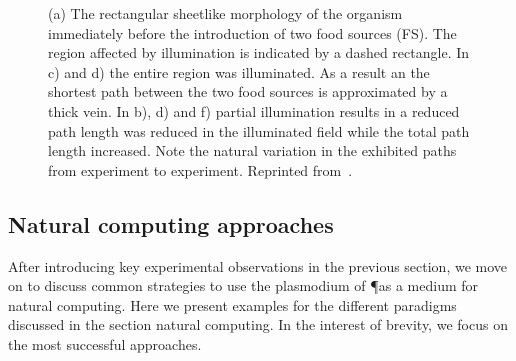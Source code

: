 			\begin{figure}[htop]
				\centering
				\newline
				\newline

				\caption[Classic maze experiment with \P]{(a)  The  rectangular  sheetlike  morphology  of  the organism  immediately  before  the  introduction  of  two  food sources (FS). The region affected by illumination is indicated by a dashed rectangle. In c) and d) the entire region was illuminated. As a result an the shortest path between the two food sources is approximated by a thick vein. In b), d) and f) partial illumination results in a reduced path length was reduced in the illuminated field while the total path length increased. Note the natural variation in the exhibited paths from experiment to experiment.  Reprinted from~\cite{PhysRevLett.99.068104}.}
				\label{fig:snell}
			\end{figure}

	\subsection{Natural computing approaches}

		After introducing key experimental observations in the previous section, we move on to discuss common strategies to use the plasmodium of \P as a medium for natural computing. 
		Here we present examples for the different paradigms discussed in the section natural computing. In the interest of brevity, we focus on the most successful approaches.

